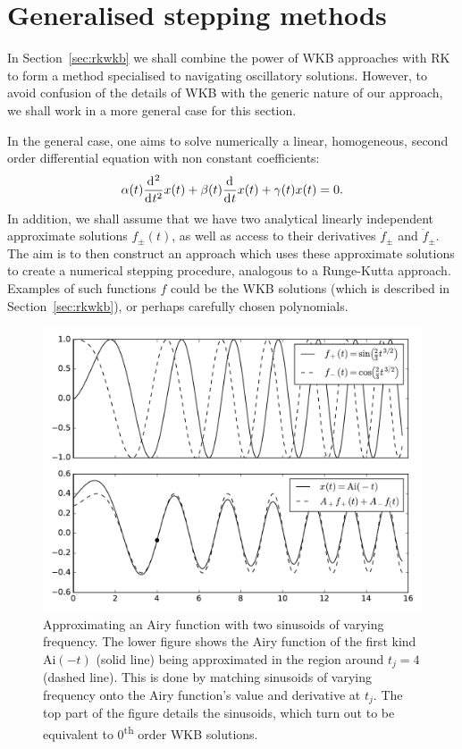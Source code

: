 \section{Generalised stepping methods}
\label{sec:stepping_methods}
In Section~\ref{sec:rkwkb} we shall combine the power of WKB approaches with RK to form a method specialised to navigating oscillatory solutions. However, to avoid confusion of the details of WKB with the generic nature of our approach, we shall work in a more general case for this section.

In the general case, one aims to solve numerically a linear, homogeneous, second order differential equation with non constant coefficients:
\begin{equation}
    \alpha(t) \frac{\operatorname{d}^{}\!{}^2}{\operatorname{d}^{}\!{t}^2}x(t) + \beta(t) \frac{\operatorname{d}^{}\!{}}{\operatorname{d}^{}\!{t}}x(t) + \gamma(t) x(t) = 0.
    \label{eqn:general_second_order}
\end{equation}
In addition, we shall assume that we have two analytical linearly independent approximate solutions \(f_\pm(t)\), as well as access to their derivatives \(\dot{f}_\pm\) and \(\ddot{f}_\pm\). The aim is to then construct an approach which uses these approximate solutions to create a numerical stepping procedure, analogous to a Runge-Kutta approach. Examples of such functions $f$ could be the WKB solutions (which is described in Section~\ref{sec:rkwkb}), or perhaps carefully chosen polynomials.

\begin{figure}
  \includegraphics[width=\textwidth]{chapters/RKWKB/figures/matching}
  \caption{Approximating an Airy function with two sinusoids of varying frequency. The lower figure shows the Airy function of the first kind \(\mathrm{Ai}(-t)\) (solid line) being approximated in the region around \(t_j=4\) (dashed line). This is done by matching sinusoids of varying frequency onto the Airy function's value and derivative at \(t_j\). The top part of the figure details the sinusoids, which turn out to be equivalent to 0\textsuperscript{th} order WKB solutions.}\label{fig:matching}
\end{figure}

